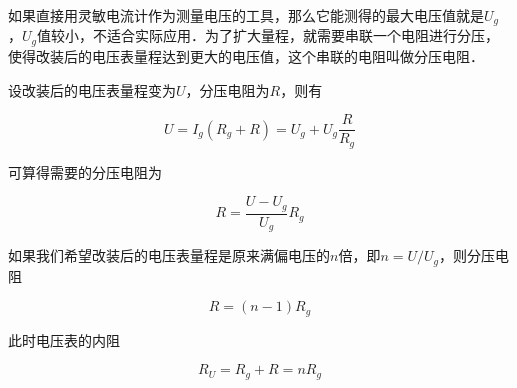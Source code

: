 如果直接用灵敏电流计作为测量电压的工具，那么它能测得的最大电压值就是$U_g$，$U_g$值较小，不适合实际应用．为了扩大量程，就需要串联一个电阻进行分压，使得改装后的电压表量程达到更大的电压值，这个串联的电阻叫做分压电阻．

设改装后的电压表量程变为$U$，分压电阻为$R$，则有

\begin{equation}
U=I_g(R_g+R)=U_g+U_g\frac{R}{R_g}
\end{equation}

可算得需要的分压电阻为

\begin{equation}
R=\frac{U-U_g}{U_g}R_g
\end{equation}

如果我们希望改装后的电压表量程是原来满偏电压的$n$倍，即$n=U/U_g$，则分压电阻

\begin{equation}
R=(n-1)R_g
\end{equation}

此时电压表的内阻

\begin{equation}
R_U=R_g+R=nR_g
\end{equation}
